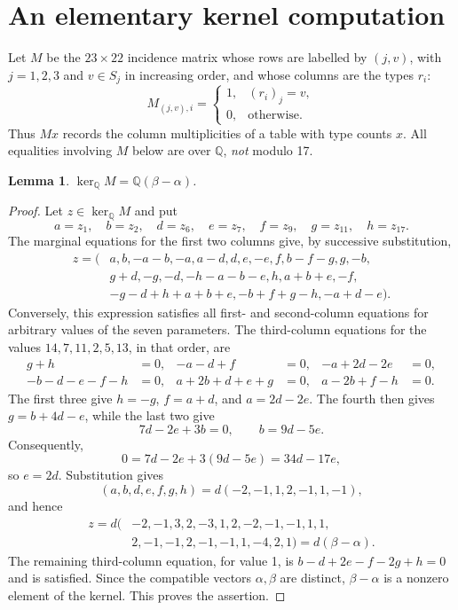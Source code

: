 \documentclass[11pt,a4paper]{article}
\newtheorem{lemma}[theorem]{Lemma}
\newcommand{\QQ}{\mathbb Q}
\begin{document}
\clearpage
\section{An elementary kernel computation}
Let $M$ be the $23\times22$ incidence matrix whose rows are labelled by
$(j,v)$, with $j=1,2,3$ and $v\in S_j$ in increasing order, and whose
columns are the types $r_i$:
\[
 M_{(j,v),i}=\begin{cases}1,&(r_i)_j=v,\\0,&\text{otherwise.}\end{cases}
\]
Thus $Mx$ records the column multiplicities of a table with type counts $x$.
All equalities involving $M$ below are over $\QQ$, \emph{not} modulo 17.

\begin{lemma}\label{lem:kernel}
$\ker_{\QQ}M=\QQ(\beta-\alpha)$.
\end{lemma}
\begin{proof}
Let $z\in\ker_{\QQ}M$ and put
\[
 a=z_1,\quad b=z_2,\quad d=z_6,\quad e=z_7,\quad
 f=z_9,\quad g=z_{11},\quad h=z_{17}.
\]
The marginal equations for the first two columns give, by successive
substitution,
\begin{align*}
z=(&a,b,-a-b,-a,a-d,d,e,-e,f,b-f-g,g,-b,\\
   &g+d,-g,-d,-h-a-b-e,h,a+b+e,-f,\\
   &-g-d+h+a+b+e,-b+f+g-h,-a+d-e).
\end{align*}
Conversely, this expression satisfies all first- and second-column
equations for arbitrary values of the seven parameters.
The third-column equations for the values $14,7,11,2,5,13$, in that order,
are
\begin{align*}
 g+h&=0,& -a-d+f&=0,& -a+2d-2e&=0,\\
 -b-d-e-f-h&=0,& a+2b+d+e+g&=0,& a-2b+f-h&=0.
\end{align*}
The first three give $h=-g$, $f=a+d$, and $a=2d-2e$.
The fourth then gives $g=b+4d-e$, while the last two give
\[
 7d-2e+3b=0,\qquad b=9d-5e.
\]
Consequently,
\[
 0=7d-2e+3(9d-5e)=34d-17e,
\]
so $e=2d$. Substitution gives
\[
 (a,b,d,e,f,g,h)=d(-2,-1,1,2,-1,1,-1),
\]
and hence
\begin{align*}
z=d(&-2,-1,3,2,-3,1,2,-2,-1,-1,1,1,\\
    &2,-1,-1,2,-1,-1,1,-4,2,1)=d(\beta-\alpha).
\end{align*}
The remaining third-column equation, for value 1, is
$b-d+2e-f-2g+h=0$ and is satisfied. Since the compatible vectors
$\alpha,\beta$ are distinct, $\beta-\alpha$ is a nonzero element of the
kernel. This proves the assertion.
\end{proof}
\end{document}
